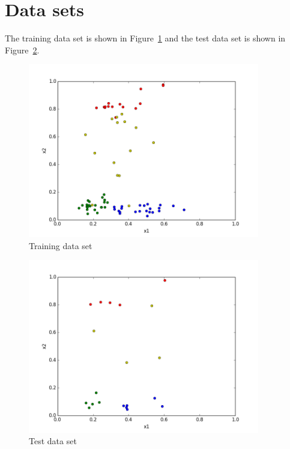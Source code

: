\documentclass[]{article}
\begin{document}
\section{Data sets}

The training data set is shown in Figure~\ref{fig:train_data} and the test data set is shown in Figure~\ref{fig:test_data}.

\begin{figure}[h]
    \centering
    \includegraphics[width=0.9\textwidth]{figures/train_data.png}
    \caption{Training data set}
    \label{fig:train_data}
\end{figure}

\begin{figure}[h]
    \centering
    \includegraphics[width=0.9\textwidth]{figures/test_data.png}
    \caption{Test data set}
    \label{fig:test_data}
\end{figure}
\end{document}
